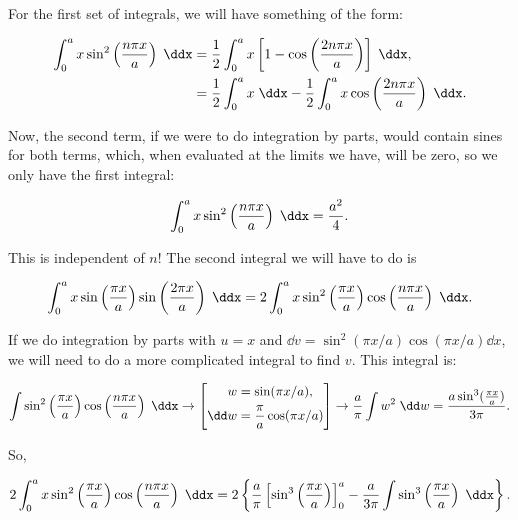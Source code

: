 \begin{parts}
For the first set of integrals, we will have something of the form:

\begin{align*}
    \int_0^a x\sin^2\left( \frac{n\pi x}{a} \right)\;\ddx &= \frac{1}{2}\int_0^a x\left[ 1 - \cos\left( \frac{2n\pi x}{a} \right) \right]\;\ddx, \\
    &= \frac{1}{2}\int_0^a x\;\ddx - \frac{1}{2}\int_0^a x\cos\left( \frac{2n\pi x}{a} \right)\;\ddx.
\end{align*}

Now, the second term, if we were to do integration by parts, would contain sines for both terms, which, when evaluated at the limits we have, will be zero, so we only have the first integral:

\begin{equation*}
    \int_0^a x\sin^2\left( \frac{n\pi x}{a} \right)\;\ddx = \frac{a^2}{4}.
\end{equation*}

This is independent of $n$! The second integral we will have to do is

\begin{equation*}
    \int_0^a x\sin\left( \frac{\pi x}{a} \right)\sin\left( \frac{2\pi x}{a} \right)\;\ddx = 2\int_0^a x\sin^2\left( \frac{\pi x}{a} \right)\cos\left( \frac{n\pi x}{a} \right)\;\ddx.
\end{equation*}

If we do integration by parts with $u=x$ and $\dd v = \sin^2(\pi x/a)\cos(\pi x/a)\dd x$, we will need to do a more complicated integral to find $v$. This integral is:

\begin{equation*}
    \int \sin^2\left( \frac{\pi x}{a} \right)\cos\left( \frac{n\pi x}{a} \right) \;\ddx
    \rightarrow \left[
        \begin{alignedat}{1}
            w &= \sin(\pi x/a), \\
            \dd w &= \frac{\pi}{a}\cos(\pi x/a)
        \end{alignedat}
    \right] \rightarrow 
    \frac{a}{\pi}\int w^2 \;\dd w = \frac{a\sin^3(\frac{\pi x}{a})}{3\pi}.
\end{equation*}

So,

\begin{equation*}
    2\int_0^a x\sin^2\left( \frac{\pi x}{a} \right)\cos\left( \frac{n\pi x}{a} \right)\;\ddx = 2\left\{ \frac{a}{\pi}\left[ \sin^3\left( \frac{\pi x}{a} \right) \right]_0^a - \frac{a}{3\pi} \int\sin^3\left( \frac{\pi x}{a} \right)\;\ddx \right\}.
\end{equation*}


\end{parts}
